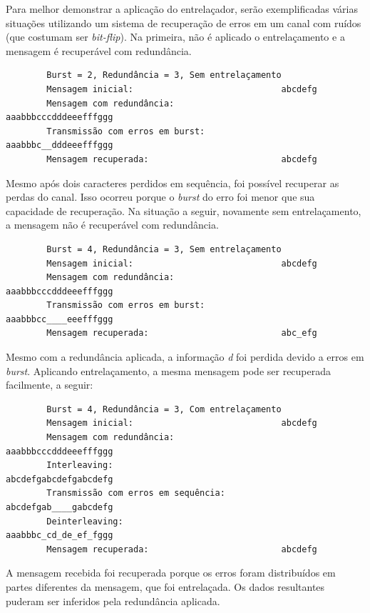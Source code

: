 	Para melhor demonstrar a aplicação do entrelaçador, serão exemplificadas várias situações utilizando um sistema de recuperação de erros em um canal com ruídos (que costumam ser \textit{bit-flip}). Na primeira, não é aplicado o entrelaçamento e a mensagem é recuperável com redundância.

	\begin{verbatim}
	    Burst = 2, Redundância = 3, Sem entrelaçamento
	    Mensagem inicial:                             abcdefg
	    Mensagem com redundância:                     aaabbbcccdddeeefffggg
	    Transmissão com erros em burst:               aaabbbc__dddeeefffggg
	    Mensagem recuperada:                          abcdefg
	\end{verbatim}

	Mesmo após dois caracteres perdidos em sequência, foi possível recuperar as perdas do canal. Isso ocorreu porque o \textit{burst} do erro foi menor que sua capacidade de recuperação. Na situação a seguir, novamente sem entrelaçamento, a mensagem não é recuperável com redundância.
	
	\begin{verbatim}
	    Burst = 4, Redundância = 3, Sem entrelaçamento
	    Mensagem inicial:                             abcdefg
	    Mensagem com redundância:                     aaabbbcccdddeeefffggg
	    Transmissão com erros em burst:               aaabbbcc____eeefffggg
	    Mensagem recuperada:                          abc_efg
	\end{verbatim}
	
	Mesmo com a redundância aplicada, a informação \textit{d} foi perdida devido a erros em \textit{burst}. Aplicando entrelaçamento, a mesma mensagem pode ser recuperada facilmente, a seguir:
	
	\begin{verbatim}
	    Burst = 4, Redundância = 3, Com entrelaçamento
	    Mensagem inicial:                             abcdefg
	    Mensagem com redundância:                     aaabbbcccdddeeefffggg
	    Interleaving:                                 abcdefgabcdefgabcdefg
	    Transmissão com erros em sequência:           abcdefgab____gabcdefg
	    Deinterleaving:                               aaabbbc_cd_de_ef_fggg
	    Mensagem recuperada:                          abcdefg
	\end{verbatim}
	
	A mensagem recebida foi recuperada porque os erros foram distribuídos em partes diferentes da mensagem, que foi entrelaçada. Os dados resultantes puderam ser inferidos pela redundância aplicada.
	
